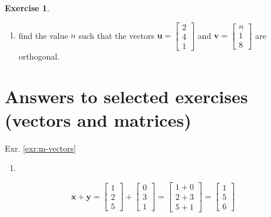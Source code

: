 \documentclass[
]{book}
\providecommand{\tightlist}{%
  \setlength{\itemsep}{0pt}\setlength{\parskip}{0pt}}
\theoremstyle{definition}
\theoremstyle{definition}
\theoremstyle{definition}
\newtheorem{exercise}{Exercise}[chapter]
\theoremstyle{remark}
\begin{document}
\begin{exercise}
\begin{enumerate}
\item
  find the value \(n\) such that the vectors \(\mathbf{u} =\begin{bmatrix}  2 \\  4 \\  1 \end{bmatrix}\) and \(\mathbf{v} =\begin{bmatrix}  n\\  1 \\  8  \end{bmatrix}\) are orthogonal.
\end{enumerate}
\end{exercise}

\hypertarget{answers-to-selected-exercises-vectors-and-matrices}{%
\section*{Answers to selected exercises (vectors and matrices)}\label{answers-to-selected-exercises-vectors-and-matrices}}

Exr. \ref{exr:m-vectors}

\begin{enumerate}
\def\labelenumi{\alph{enumi})}
\tightlist
\item
\end{enumerate}

\[\mathbf{x} + \mathbf{y} = \begin{bmatrix} 1 \\ 2 \\ 5 \end{bmatrix} + \begin{bmatrix} 0 \\ 3 \\ 1 \end{bmatrix} = \begin{bmatrix} 1 + 0\\ 2 + 3 \\ 5 + 1 \end{bmatrix} = \begin{bmatrix} 1 \\ 5 \\ 6 \end{bmatrix}\]
\end{document}
